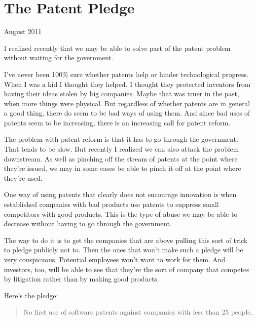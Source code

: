 \chapter{The Patent Pledge}

August 2011

I realized recently that we may be able to solve part of the patent
problem without waiting for the government.

I've never been 100\% sure whether patents help or hinder technological
progress. When I was a kid I thought they helped. I thought they
protected inventors from having their ideas stolen by big companies.
Maybe that was truer in the past, when more things were physical. But
regardless of whether patents are in general a good thing, there do seem
to be bad ways of using them. And since bad uses of patents seem to be
increasing, there is an increasing call for patent reform.

The problem with patent reform is that it has to go through the
government. That tends to be slow. But recently I realized we can also
attack the problem downstream. As well as pinching off the stream of
patents at the point where they're issued, we may in some cases be able
to pinch it off at the point where they're used.

One way of using patents that clearly does not encourage innovation is
when established companies with bad products use patents to suppress
small competitors with good products. This is the type of abuse we may
be able to decrease without having to go through the government.

The way to do it is to get the companies that are above pulling this
sort of trick to pledge publicly not to. Then the ones that won't make
such a pledge will be very conspicuous. Potential employees won't want
to work for them. And investors, too, will be able to see that they're
the sort of company that competes by litigation rather than by making
good products.

Here's the pledge:

\begin{quote}
No first use of software patents against companies with less than 25
people.
\end{quote}

